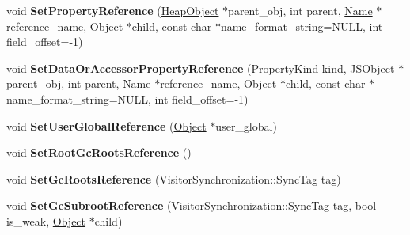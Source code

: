 \begin{DoxyCompactItemize}
\item 
void {\bfseries Set\+Property\+Reference} (\hyperlink{classv8_1_1internal_1_1_heap_object}{Heap\+Object} $\ast$parent\+\_\+obj, int parent, \hyperlink{classv8_1_1internal_1_1_name}{Name} $\ast$reference\+\_\+name, \hyperlink{classv8_1_1internal_1_1_object}{Object} $\ast$child, const char $\ast$name\+\_\+format\+\_\+string=N\+U\+LL, int field\+\_\+offset=-\/1)\hypertarget{classv8_1_1internal_1_1_v8_heap_explorer_a5a668f6421244571725cc3c2ec121ad3}{}\label{classv8_1_1internal_1_1_v8_heap_explorer_a5a668f6421244571725cc3c2ec121ad3}

\item 
void {\bfseries Set\+Data\+Or\+Accessor\+Property\+Reference} (Property\+Kind kind, \hyperlink{classv8_1_1internal_1_1_j_s_object}{J\+S\+Object} $\ast$parent\+\_\+obj, int parent, \hyperlink{classv8_1_1internal_1_1_name}{Name} $\ast$reference\+\_\+name, \hyperlink{classv8_1_1internal_1_1_object}{Object} $\ast$child, const char $\ast$name\+\_\+format\+\_\+string=N\+U\+LL, int field\+\_\+offset=-\/1)\hypertarget{classv8_1_1internal_1_1_v8_heap_explorer_aa9e2d237f23c57d29ecc68fc2e978c5b}{}\label{classv8_1_1internal_1_1_v8_heap_explorer_aa9e2d237f23c57d29ecc68fc2e978c5b}

\item 
void {\bfseries Set\+User\+Global\+Reference} (\hyperlink{classv8_1_1internal_1_1_object}{Object} $\ast$user\+\_\+global)\hypertarget{classv8_1_1internal_1_1_v8_heap_explorer_aa3b254a319a672b56b962bc52bad7f0f}{}\label{classv8_1_1internal_1_1_v8_heap_explorer_aa3b254a319a672b56b962bc52bad7f0f}

\item 
void {\bfseries Set\+Root\+Gc\+Roots\+Reference} ()\hypertarget{classv8_1_1internal_1_1_v8_heap_explorer_a91255c5226b4d3708a3e3788a23e8592}{}\label{classv8_1_1internal_1_1_v8_heap_explorer_a91255c5226b4d3708a3e3788a23e8592}

\item 
void {\bfseries Set\+Gc\+Roots\+Reference} (Visitor\+Synchronization\+::\+Sync\+Tag tag)\hypertarget{classv8_1_1internal_1_1_v8_heap_explorer_a4bf417ed09e531dc69905939731cff33}{}\label{classv8_1_1internal_1_1_v8_heap_explorer_a4bf417ed09e531dc69905939731cff33}

\item 
void {\bfseries Set\+Gc\+Subroot\+Reference} (Visitor\+Synchronization\+::\+Sync\+Tag tag, bool is\+\_\+weak, \hyperlink{classv8_1_1internal_1_1_object}{Object} $\ast$child)\hypertarget{classv8_1_1internal_1_1_v8_heap_explorer_a2a141abd338bec35edfc7a3ae0cf4f57}{}\label{classv8_1_1internal_1_1_v8_heap_explorer_a2a141abd338bec35edfc7a3ae0cf4f57}


\end{DoxyCompactItemize}
